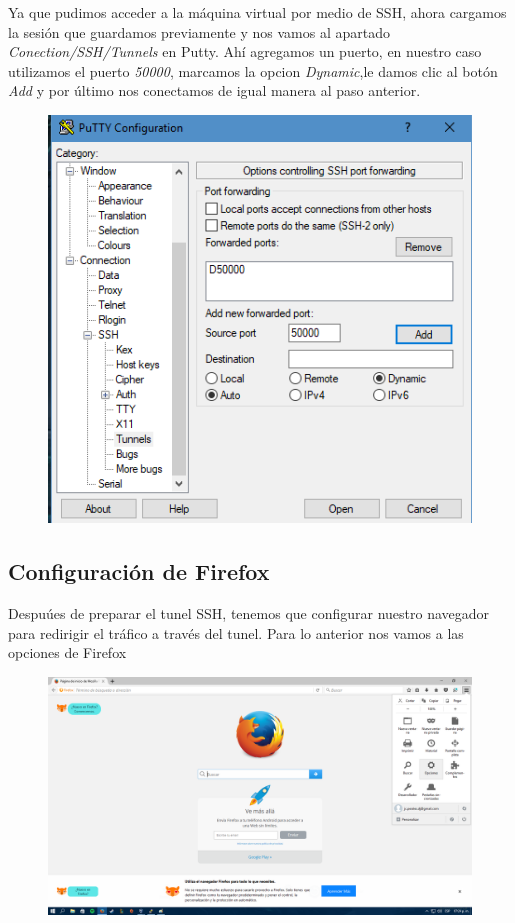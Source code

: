 \documentclass{article}
\begin{document}
Ya que pudimos acceder a la m\'aquina virtual por medio de SSH, ahora cargamos la sesi\'on que guardamos previamente y nos vamos al apartado \emph{Conection/SSH/Tunnels} en Putty. Ah\'i agregamos un puerto, en nuestro caso utilizamos el puerto \emph{50000}, marcamos la opcion \emph{Dynamic},le damos clic al bot\'on \emph{Add} y por \'ultimo nos conectamos de igual manera al paso anterior.

\begin{figure}[H]
\centering
\includegraphics[width=1\textwidth]{10-PUERTO50000}
\end{figure}

\subsection{Configuraci\'on de Firefox}

Despu\'ues de preparar el tunel SSH, tenemos que configurar nuestro navegador para redirigir el tr\'afico a trav\'es del tunel. Para lo anterior nos vamos a las opciones de Firefox

\begin{figure}[H]
\centering
\includegraphics[width=1\textwidth]{11-OPCIONESFIREFOX}
\end{figure}
\end{document}
